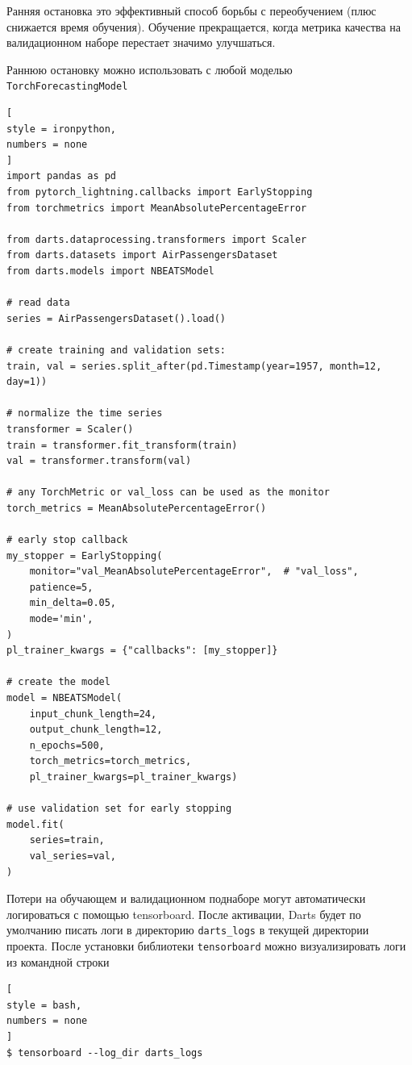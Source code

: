 \documentclass[%
	11pt,
	a4paper,
	utf8,
		]{article}
\begin{document}
Ранняя остановка это эффективный способ борьбы с переобучением (плюс снижается время обучения). Обучение прекращается, когда метрика качества на валидационном наборе перестает значимо улучшаться.

Раннюю остановку можно использовать с любой моделью \verb|TorchForecastingModel|
\begin{lstlisting}[
style = ironpython,
numbers = none
]
import pandas as pd
from pytorch_lightning.callbacks import EarlyStopping
from torchmetrics import MeanAbsolutePercentageError

from darts.dataprocessing.transformers import Scaler
from darts.datasets import AirPassengersDataset
from darts.models import NBEATSModel

# read data
series = AirPassengersDataset().load()

# create training and validation sets:
train, val = series.split_after(pd.Timestamp(year=1957, month=12, day=1))

# normalize the time series
transformer = Scaler()
train = transformer.fit_transform(train)
val = transformer.transform(val)

# any TorchMetric or val_loss can be used as the monitor
torch_metrics = MeanAbsolutePercentageError()

# early stop callback
my_stopper = EarlyStopping(
	monitor="val_MeanAbsolutePercentageError",  # "val_loss",
	patience=5,
	min_delta=0.05,
	mode='min',
)
pl_trainer_kwargs = {"callbacks": [my_stopper]}

# create the model
model = NBEATSModel(
	input_chunk_length=24,
	output_chunk_length=12,
	n_epochs=500,
	torch_metrics=torch_metrics,
	pl_trainer_kwargs=pl_trainer_kwargs)

# use validation set for early stopping
model.fit(
	series=train,
	val_series=val,
)
\end{lstlisting}

Потери на обучающем и валидационном поднаборе могут автоматически логироваться с помощью tensorboard. После активации, Darts будет по умолчанию писать логи в директорию \verb|darts_logs| в текущей директории проекта. После установки библиотеки \verb|tensorboard| можно визуализировать логи  из командной строки
\begin{lstlisting}[
style = bash,
numbers = none
]
$ tensorboard --log_dir darts_logs
\end{lstlisting}
\end{document}
